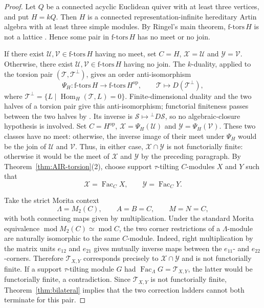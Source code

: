 \documentclass[11pt,reqno]{amsart}
\theoremstyle{definition}
\theoremstyle{remark}
\newcommand{\modu}{\operatorname{mod}}
\newcommand{\Fac}{\operatorname{Fac}}
\newcommand{\Hom}{\operatorname{Hom}}
\numberwithin{equation}{section}
\begin{document}
\begin{proof}
Let $Q$ be a connected acyclic Euclidean quiver with at least three
vertices, and put $H=kQ$.  Then $H$ is a connected representation-infinite
hereditary Artin algebra with at least three simple modules.  By Ringel's
main theorem, $\mathrm{f\text{-}tors}\,H$ is not a lattice
\cite[Theorem]{Ringel}.  Hence some pair in
$\mathrm{f\text{-}tors}\,H$ has no meet or no join.

If there exist $\mathcal U,\mathcal V\in\mathrm{f\text{-}tors}\,H$ having
no meet, set $C=H$, $\mathcal X=\mathcal U$ and
$\mathcal Y=\mathcal V$.  Otherwise, there exist
$\mathcal U,\mathcal V\in\mathrm{f\text{-}tors}\,H$ having no join.  The
$k$-duality, applied to the torsion pair
$(\mathcal T,\mathcal T^{\perp})$, gives an order anti-isomorphism
\[
 \Psi_H:\mathrm{f\text{-}tors}\,H
 \longrightarrow \mathrm{f\text{-}tors}\,H^{\mathrm{op}},
 \qquad
 \mathcal T\longmapsto D(\mathcal T^{\perp}),
\]
where
$\mathcal T^{\perp}=\{L\mid\Hom_H(\mathcal T,L)=0\}$.
Finite-dimensional duality and the two halves of a torsion pair give this
anti-isomorphism; functorial finiteness passes between the two halves by
\cite[Proposition~2.1(a),(b)]{Jasso}.  Its inverse is
$\mathcal S\mapsto{}^{\perp}D\mathcal S$, so no algebraic-closure hypothesis
is involved.  Set $C=H^{\mathrm{op}}$,
$\mathcal X=\Psi_H(\mathcal U)$ and
$\mathcal Y=\Psi_H(\mathcal V)$.  These two classes have no meet: otherwise,
the inverse image of their meet under $\Psi_H$ would be the join of
$\mathcal U$ and $\mathcal V$.  Thus, in either case,
$\mathcal X\cap\mathcal Y$ is not functorially finite: otherwise it would be
the meet of $\mathcal X$ and $\mathcal Y$ by the preceding paragraph.
By Theorem~\ref{thm:AIR-torsion}\textup{(2)}, choose support
$\tau$-tilting $C$-modules $X$ and $Y$ such that
\[
 \mathcal X=\Fac_CX,
 \qquad
 \mathcal Y=\Fac_CY.
\]

Take the strict Morita context
\[
 \Lambda=M_2(C),\qquad A=B=C,\qquad M=N=C,
\]
with both connecting maps given by multiplication.  Under the standard
Morita equivalence $\modu M_2(C)\simeq\modu C$, the two corner restrictions
of a $\Lambda$-module are naturally isomorphic to the same $C$-module.
Indeed, right multiplication by the matrix units $e_{12}$ and $e_{21}$
gives mutually inverse maps between the $e_{11}$- and $e_{22}$-corners.
Therefore $\mathcal T_{X,Y}$ corresponds precisely to
$\mathcal X\cap\mathcal Y$ and is not functorially finite.  If a support
$\tau$-tilting module $G$ had
$\Fac_\Lambda G=\mathcal T_{X,Y}$, the latter would be functorially finite,
a contradiction.  Since $\mathcal T_{X,Y}$ is not functorially finite,
Theorem~\ref{thm:bilateral} implies that the two correction ladders cannot
both terminate for this pair.
\end{proof}
\end{document}
